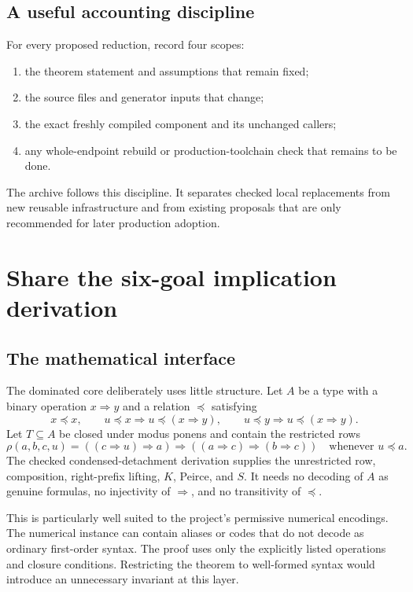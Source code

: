 \documentclass[11pt,letterpaper]{article}
\begin{document}
\subsection{A useful accounting discipline}

For every proposed reduction, record four scopes:
\begin{enumerate}
\item the theorem statement and assumptions that remain fixed;
\item the source files and generator inputs that change;
\item the exact freshly compiled component and its unchanged callers;
\item any whole-endpoint rebuild or production-toolchain check that remains to be done.
\end{enumerate}
The archive follows this discipline. It separates checked local replacements from
new reusable infrastructure and from existing proposals that are only recommended
for later production adoption.

\section{Share the six-goal implication derivation}

\subsection{The mathematical interface}

The dominated core deliberately uses little structure. Let $A$ be a type with a binary
operation $x\Rightarrow y$ and a relation $\preceq$ satisfying
\[
 x\preceq x,\qquad
 u\preceq x\Longrightarrow u\preceq(x\Rightarrow y),\qquad
 u\preceq y\Longrightarrow u\preceq(x\Rightarrow y).
\]
Let $T\subseteq A$ be closed under modus ponens and contain the restricted rows
\[
 \rho(a,b,c,u)
 =((c\Rightarrow u)\Rightarrow a)
      \Rightarrow((a\Rightarrow c)\Rightarrow(b\Rightarrow c))
 \quad\text{whenever }u\preceq a.
\]
The checked condensed-detachment derivation supplies the unrestricted row, composition,
right-prefix lifting, $K$, Peirce, and $S$. It needs no decoding of $A$ as genuine
formulas, no injectivity of $\Rightarrow$, and no transitivity of $\preceq$.

This is particularly well suited to the project's permissive numerical encodings.
The numerical instance can contain aliases or codes that do not decode as ordinary
first-order syntax. The proof uses only the explicitly listed operations and closure
conditions. Restricting the theorem to well-formed syntax would introduce an unnecessary
invariant at this layer.
\end{document}

